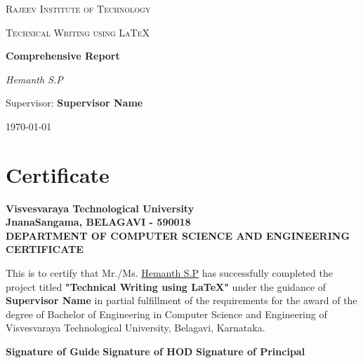 \documentclass[12pt,a4paper]{report}
\begin{document}
\begin{titlepage}
    \centering
    {\scshape\LARGE Rajeev Institute of Technology \par}
    \vspace{1cm}
    {\scshape\Large Technical Writing using LaTeX\par}
    \vspace{1.5cm}
    {\huge\bfseries Comprehensive Report\par}
    \vspace{2cm}
    {\Large\itshape Hemanth S.P\par}
    \vfill
    Supervisor: \textbf{Supervisor Name}

    \vfill

    {\large \today\par}
\end{titlepage}

\chapter*{Certificate}
\thispagestyle{empty}
\begin{center}
    \textbf{\large Visvesvaraya Technological University}\\
    \textbf{\small JnanaSangama, BELAGAVI - 590018}\\
    \vspace{0.5cm}
    \textbf{\small DEPARTMENT OF COMPUTER SCIENCE AND ENGINEERING}\\
    \vspace{0.5cm}
    \textbf{\large CERTIFICATE}
\end{center}
\vspace{0.5cm}
\justify
This is to certify that Mr./Ms. \underline{Hemanth S.P}{\hspace{0.1cm}} has successfully completed the project titled \textbf{"Technical Writing using LaTeX"} under the guidance of \textbf{Supervisor Name} in partial fulfillment of the requirements for the award of the degree of Bachelor of Engineering in Computer Science and Engineering of Visvesvaraya Technological University, Belagavi, Karnataka.
\vspace{1cm}

\begin{flushleft}
\textbf{Signature of Guide} \hfill \textbf{Signature of HOD} \hfill \textbf{Signature of Principal}
\end{flushleft}

\newpage
\end{document}
